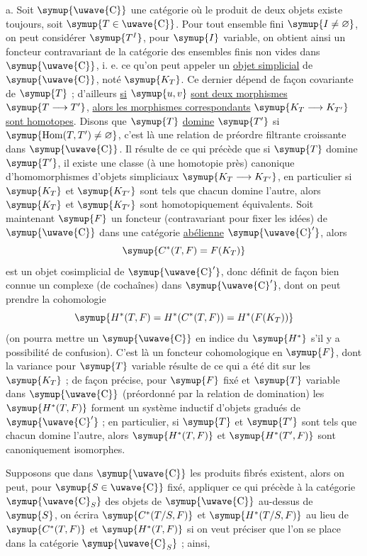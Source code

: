 \medskip\noindent
a. Soit $\symup{\text{\uwave{C}}}$ une catégorie où le produit de deux objets existe toujours,
soit $\symup{T\in\text{\uwave{C}}}$. Pour tout ensemble fini $\symup{I\ne\varnothing}$, on peut
considérer $\symup{T^I}$, pour $\symup{I}$ variable, on obtient ainsi un foncteur contravariant de
la catégorie des ensembles finis non vides dans $\symup{\text{\uwave{C}}}$, i. e. ce qu'on
peut appeler un \uline{objet simplicial} de $\symup{\text{\uwave{C}}}$, noté $\symup{K_T}$. Ce dernier
dépend de façon covariante de $\symup{T}$ ; d'ailleurs \uline{si} $\symup{u,v}$ \uline{sont deux morphismes}
$\symup{T\longrightarrow T'}$, \uline{alors les morphismes correspondants}
$\symup{K_T\longrightarrow K_{T'}}$ \uline{sont homotopes}. Disons que $\symup{T}$ \uline{domine} $\symup{T'}$
si $\symup{\operatorname{Hom}(T,T')\ne\varnothing}$, c'est là une relation de préordre
filtrante croissante dans $\symup{\text{\uwave{C}}}$. Il résulte de ce qui précède que si $\symup{T}$
domine $\symup{T'}$, il existe une classe (à une homotopie près) canonique
d'homomorphismes d'objets simpliciaux $\symup{K_T\longrightarrow K_{T'}}$, en
particulier si $\symup{K_T}$ et $\symup{K_{T'}}$ sont tels que chacun domine l'autre, alors
$\symup{K_T}$ et $\symup{K_{T'}}$ sont homotopiquement équivalents. Soit maintenant $\symup{F}$ un
foncteur (contravariant pour fixer les idées) de $\symup{\text{\uwave{C}}}$ dans une catégorie
\uline{abélienne} $\symup{\text{\uwave{C}}'}$, alors
\[
  \symup{C^*(T,F)=F(K_T)}
\]
est un objet cosimplicial de $\symup{\text{\uwave{C}}'}$, donc définit de façon bien connue
un complexe (de cochaînes) dans $\symup{\text{\uwave{C}}'}$, dont on peut prendre la
cohomologie
\[
  \symup{H^*(T,F)=H^*(C^*(T,F))=H^*(F(K_T))}
\]
(on pourra mettre un $\symup{\text{\uwave{C}}}$ en indice du $\symup{H^*}$ s'il y a possibilité de
confusion). C'est là un foncteur cohomologique en $\symup{F}$, dont la variance pour $\symup{T}$
variable résulte de ce qui a été dit sur les $\symup{K_T}$ ; de façon précise, pour $\symup{F}$
fixé et $\symup{T}$ variable dans $\symup{\text{\uwave{C}}}$ (préordonné par la relation de
domination) les $\symup{H^*(T,F)}$ forment un système inductif d'objets gradués de
$\symup{\text{\uwave{C}}'}$ ; en particulier, si $\symup{T}$ et $\symup{T'}$ sont tels que chacun domine
l'autre, alors $\symup{H^*(T,F)}$ et $\symup{H^*(T',F)}$ sont canoniquement isomorphes.

Supposons que dans $\symup{\text{\uwave{C}}}$ les produits fibrés existent, alors on peut,
pour $\symup{S\in\text{\uwave{C}}}$ fixé, appliquer ce qui précède à la catégorie
$\symup{\text{\uwave{C}}_S}$ des objets de $\symup{\text{\uwave{C}}}$ au-dessus de $\symup{S}$, on écrira
$\symup{C^*(T/S,F)}$ et $\symup{H^*(T/S,F)}$ au lieu de $\symup{C^*(T,F)}$ et $\symup{H^*(T,F)}$ si on veut
préciser que l'on se place dans la catégorie $\symup{\text{\uwave{C}}_S}$ ; ainsi,

